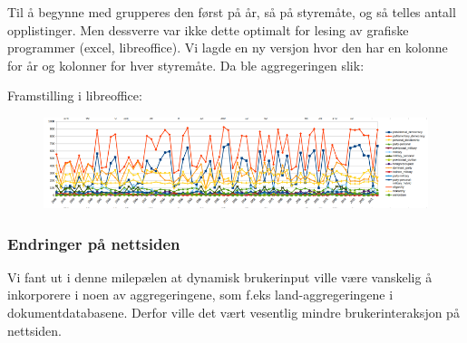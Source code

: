 
Til å begynne med grupperes den først på år, så på styremåte, og så telles antall opplistinger. Men dessverre var ikke dette optimalt for lesing av grafiske programmer (excel, libreoffice). Vi lagde en ny versjon hvor den har en kolonne for år og kolonner for hver styremåte. Da ble aggregeringen slik:


Framstilling i libreoffice:

\FigureCounter
\begin{figure}[H]
    \includegraphics[width=\textwidth]{images/milepael5/libreOfficeGovPop.png}
\end{figure}

\subsubsection{Endringer på nettsiden}
Vi fant ut i denne milepælen at dynamisk brukerinput ville være vanskelig å inkorporere i noen av aggregeringene, som f.eks land-aggregeringene i dokumentdatabasene. Derfor ville det vært vesentlig mindre brukerinteraksjon på nettsiden.
